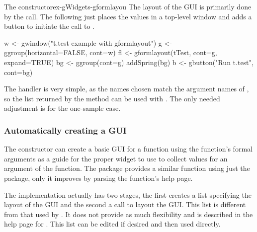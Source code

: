 \begin{example}{The  constructor}{ex-gWidgets-gformlayou}
The layout of the GUI is primarily done by the 
call. The following just places the values in a top-level window and adds a
button to initiate the call to .

\begin{Schunk}
\begin{Sinput}
 w <- gwindow("t.test example with gformlayout")
 g <- ggroup(horizontal=FALSE, cont=w)
 fl <- gformlayout(tTest, cont=g, expand=TRUE)
 bg <- ggroup(cont=g)
 addSpring(bg)
 b <- gbutton("Run t.test", cont=bg)
\end{Sinput}
\end{Schunk}

The handler is very simple, as the names chosen match the argument
names of , so the list returned by the 
method can be used with . The only needed adjustment is
for the one-sample case.

\begin{Schunk}
\end{Schunk}

\end{example}

\subsubsection{Automatically creating a GUI}
\label{sec:gWidgets-autom-creat-gui}

The  constructor can create a basic GUI
for a function using the function's formal arguments as a guide for
the proper widget to use to collect values for an argument of the
function. The  package provides a similar function using
just the  package, only it improves  by
parsing the function's help page.

The implementation actually has two stages, the first creates a list
specifying the layout of the GUI and the second a call to layout the
GUI. This list is different from that used by . It
does not provide as much flexibility and is described in the help page
for . This list can be edited if desired and then
used directly.


